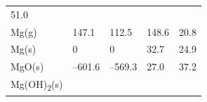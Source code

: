 \documentclass[
  9pt,
]{extbook}
\theoremstyle{definition}
\theoremstyle{definition}
\theoremstyle{definition}
\theoremstyle{remark}
\begin{document}
\begin{longtable}[]{@{}lllll@{}}
\begin{minipage}[t]{0.18\columnwidth}
51.0\strut
\end{minipage}\tabularnewline
\begin{minipage}[t]{0.10\columnwidth}\raggedright
Mg(g)\strut
\end{minipage} & \begin{minipage}[t]{0.19\columnwidth}\raggedright
147.1\strut
\end{minipage} & \begin{minipage}[t]{0.20\columnwidth}\raggedright
112.5\strut
\end{minipage} & \begin{minipage}[t]{0.18\columnwidth}\raggedright
148.6\strut
\end{minipage} & \begin{minipage}[t]{0.18\columnwidth}\raggedright
20.8\strut
\end{minipage}\tabularnewline
\begin{minipage}[t]{0.10\columnwidth}\raggedright
Mg(s)\strut
\end{minipage} & \begin{minipage}[t]{0.19\columnwidth}\raggedright
0\strut
\end{minipage} & \begin{minipage}[t]{0.20\columnwidth}\raggedright
0\strut
\end{minipage} & \begin{minipage}[t]{0.18\columnwidth}\raggedright
32.7\strut
\end{minipage} & \begin{minipage}[t]{0.18\columnwidth}\raggedright
24.9\strut
\end{minipage}\tabularnewline
\begin{minipage}[t]{0.10\columnwidth}\raggedright
MgO(s)\strut
\end{minipage} & \begin{minipage}[t]{0.19\columnwidth}\raggedright
--601.6\strut
\end{minipage} & \begin{minipage}[t]{0.20\columnwidth}\raggedright
--569.3\strut
\end{minipage} & \begin{minipage}[t]{0.18\columnwidth}\raggedright
27.0\strut
\end{minipage} & \begin{minipage}[t]{0.18\columnwidth}\raggedright
37.2\strut
\end{minipage}\tabularnewline
\begin{minipage}[t]{0.10\columnwidth}\raggedright
Mg(OH)\textsubscript{2}(s)\strut

\end{minipage}
\end{longtable}
\end{document}
